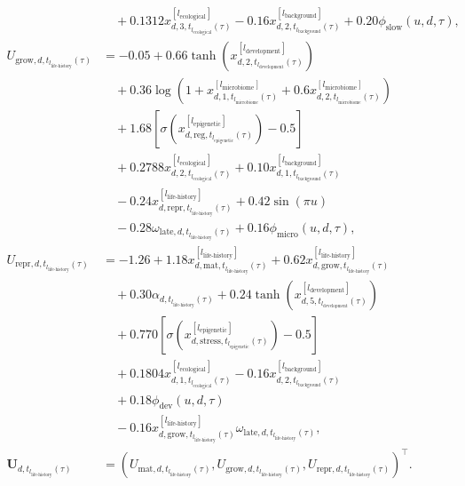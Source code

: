 \documentclass[11pt]{article}
\begin{document}
\begin{equation}
\begin{aligned}
&\quad
+0.1312x^{[l_{\mathrm{ecological}}]}_{d,3,t_{l_{\mathrm{ecological}}}(\tau)}
-0.16x^{[l_{\mathrm{background}}]}_{d,2,t_{l_{\mathrm{background}}}(\tau)}
+0.20\phi_{\mathrm{slow}}(u,d,\tau),\\
U_{\mathrm{grow},d,t_{l_{\mathrm{life\text{-}history}}}(\tau)}
&=-0.05
+0.66\tanh\!\left(
x^{[l_{\mathrm{development}}]}_{d,2,t_{l_{\mathrm{development}}}(\tau)}
\right)\\
&\quad
+0.36\log\!\left(
1+x^{[l_{\mathrm{microbiome}}]}_{d,1,t_{l_{\mathrm{microbiome}}}(\tau)}
+0.6x^{[l_{\mathrm{microbiome}}]}_{d,2,t_{l_{\mathrm{microbiome}}}(\tau)}
\right)\\
&\quad
+1.68\left[
\sigma\!\left(
x^{[l_{\mathrm{epigenetic}}]}_{d,\mathrm{reg},t_{l_{\mathrm{epigenetic}}}(\tau)}
\right)-0.5
\right]\\
&\quad
+0.2788x^{[l_{\mathrm{ecological}}]}_{d,2,t_{l_{\mathrm{ecological}}}(\tau)}
+0.10x^{[l_{\mathrm{background}}]}_{d,1,t_{l_{\mathrm{background}}}(\tau)}\\
&\quad
-0.24x^{[l_{\mathrm{life\text{-}history}}]}_{d,\mathrm{repr},t_{l_{\mathrm{life\text{-}history}}}(\tau)}
+0.42\sin(\pi u)\\
&\quad
-0.28\omega_{\mathrm{late},d,t_{l_{\mathrm{life\text{-}history}}}(\tau)}
+0.16\phi_{\mathrm{micro}}(u,d,\tau),\\
U_{\mathrm{repr},d,t_{l_{\mathrm{life\text{-}history}}}(\tau)}
&=-1.26
+1.18x^{[l_{\mathrm{life\text{-}history}}]}_{d,\mathrm{mat},t_{l_{\mathrm{life\text{-}history}}}(\tau)}
+0.62x^{[l_{\mathrm{life\text{-}history}}]}_{d,\mathrm{grow},t_{l_{\mathrm{life\text{-}history}}}(\tau)}\\
&\quad
+0.30\alpha_{d,t_{l_{\mathrm{life\text{-}history}}}(\tau)}
+0.24\tanh\!\left(
x^{[l_{\mathrm{development}}]}_{d,5,t_{l_{\mathrm{development}}}(\tau)}
\right)\\
&\quad
+0.770\left[
\sigma\!\left(
x^{[l_{\mathrm{epigenetic}}]}_{d,\mathrm{stress},t_{l_{\mathrm{epigenetic}}}(\tau)}
\right)-0.5
\right]\\
&\quad
+0.1804x^{[l_{\mathrm{ecological}}]}_{d,1,t_{l_{\mathrm{ecological}}}(\tau)}
-0.16x^{[l_{\mathrm{background}}]}_{d,2,t_{l_{\mathrm{background}}}(\tau)}\\
&\quad
+0.18\phi_{\mathrm{dev}}(u,d,\tau)\\
&\quad
-0.16x^{[l_{\mathrm{life\text{-}history}}]}_{d,\mathrm{grow},t_{l_{\mathrm{life\text{-}history}}}(\tau)}
\omega_{\mathrm{late},d,t_{l_{\mathrm{life\text{-}history}}}(\tau)},\\
\mathbf{U}_{d,t_{l_{\mathrm{life\text{-}history}}}(\tau)}
&=
\left(
U_{\mathrm{mat},d,t_{l_{\mathrm{life\text{-}history}}}(\tau)},
U_{\mathrm{grow},d,t_{l_{\mathrm{life\text{-}history}}}(\tau)},
U_{\mathrm{repr},d,t_{l_{\mathrm{life\text{-}history}}}(\tau)}
\right)^{\top}.
\end{aligned}
\label{eq:appendix-life-functions}
\end{equation}
\end{document}
